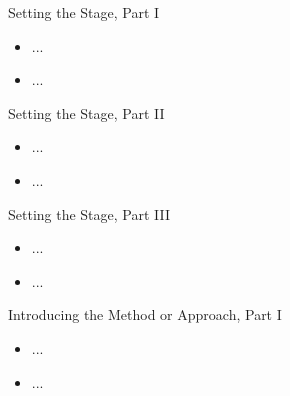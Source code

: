 \documentclass[12pt,t]{beamer}
\begin{document}
\begin{frame}[c]{Setting the Stage, Part I}

\begin{center}
\begin{itemize}
  \item ...
  \item ...
\end{itemize}
\end{center}


\end{frame}



\begin{frame}[c]{Setting the Stage, Part II}

\begin{center}
\begin{itemize}
  \item ...
  \item ...
\end{itemize}
\end{center}


\end{frame}



\begin{frame}[c]{Setting the Stage, Part III}

\begin{center}
\begin{itemize}
  \item ...
  \item ...
\end{itemize}
\end{center}


\end{frame}



\begin{frame}[c]{Introducing the Method or Approach, Part I}

\begin{center}
\begin{itemize}
  \item ...
  \item ...
\end{itemize}
\end{center}


\end{frame}
\end{document}
